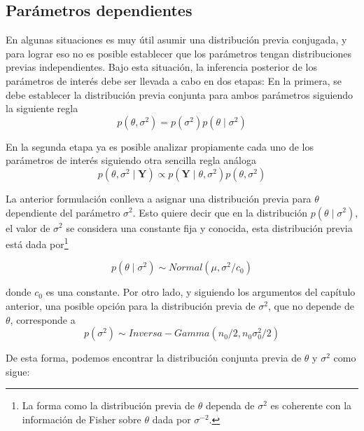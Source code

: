 \documentclass[
  10pt,
  spanish,
]{book}
\theoremstyle{definition}
\theoremstyle{definition}
\theoremstyle{definition}
\theoremstyle{definition}
\theoremstyle{remark}
\begin{document}
\hypertarget{paruxe1metros-dependientes}{%
\subsection{Parámetros dependientes}\label{paruxe1metros-dependientes}}

En algunas situaciones es muy útil asumir una distribución previa conjugada, y para lograr eso no es posible establecer que los parámetros tengan distribuciones previas independientes. Bajo esta situación, la inferencia posterior de los parámetros de interés debe ser llevada a cabo en dos etapas: En la primera, se debe establecer la distribución previa conjunta para ambos parámetros siguiendo la siguiente regla
\begin{equation*}
p(\theta,\sigma^2)=p(\sigma^2)p(\theta \mid \sigma^2)
\end{equation*}

En la segunda etapa ya es posible analizar propiamente cada uno de los parámetros de interés siguiendo otra sencilla regla análoga
\begin{equation*}
p(\theta,\sigma^2 \mid \mathbf{Y})\propto p(\mathbf{Y} \mid \theta,\sigma^2)p(\theta,\sigma^2)
\end{equation*}

La anterior formulación conlleva a asignar una distribución previa para \(\theta\) dependiente del parámetro \(\sigma^2\). Esto quiere decir que en la distribución \(p(\theta \mid \sigma^2)\), el valor de \(\sigma^2\) se considera una constante fija y conocida, esta distribución previa está dada por\footnote{La forma como la distribución previa de \(\theta\) dependa de \(\sigma^2\) es coherente con la información de Fisher sobre \(\theta\) dada por \(\sigma^{-2}\).}

\begin{equation*}
p(\theta \mid \sigma^2) \sim Normal(\mu,\sigma^2/c_0)
\end{equation*}

donde \(c_0\) es una constante. Por otro lado, y siguiendo los argumentos del capítulo anterior, una posible opción para la distribución previa de \(\sigma^2\), que no depende de \(\theta\), corresponde a
\begin{equation*}
p(\sigma^2)\sim Inversa-Gamma(n_0/2,n_0\sigma^2_0/2)
\end{equation*}

De esta forma, podemos encontrar la distribución conjunta previa de \(\theta\) y \(\sigma^2\) como sigue:
\end{document}
